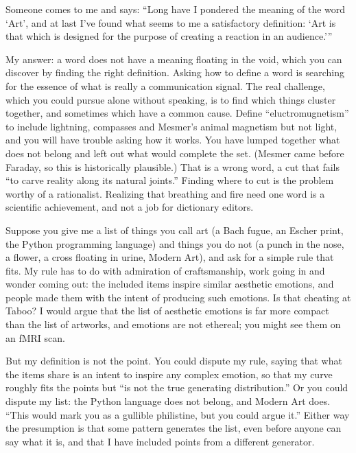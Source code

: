 
Someone comes to me and says: ``Long have I pondered the meaning of the word `Art', and at last I've found what seems to me a satisfactory definition: `Art is that which is designed for the purpose of creating a reaction in an audience.''' 

My answer: a word does not have a meaning floating in the void, which you can discover by finding the right definition. Asking how to define a word is searching for the essence of what is really a communication signal. The real challenge, which you could pursue alone without speaking, is to find which things cluster together, and sometimes which have a common cause. Define ``eluctromugnetism'' to include lightning, compasses and Mesmer's animal magnetism but not light, and you will have trouble asking how it works. You have lumped together what does not belong and left out what would complete the set. (Mesmer came before Faraday, so this is historically plausible.) That is a wrong word, a cut that fails ``to carve reality along its natural joints.'' Finding where to cut is the problem worthy of a rationalist. Realizing that breathing and fire need one word is a scientific achievement, and not a job for dictionary editors.

Suppose you give me a list of things you call art (a Bach fugue, an Escher print, the Python programming language) and things you do not (a punch in the nose, a flower, a cross floating in urine, Modern Art), and ask for a simple rule that fits. My rule has to do with admiration of craftsmanship, work going in and wonder coming out: the included items inspire similar aesthetic emotions, and people made them with the intent of producing such emotions.  Is that cheating at Taboo? I would argue that the list of aesthetic emotions is far more compact than the list of artworks, and emotions are not ethereal; you might see them on an fMRI scan.

But my definition is not the point. You could dispute my rule, saying that what the items share is an intent to inspire any complex emotion, so that my curve roughly fits the points but ``is not the true generating distribution.'' Or you could dispute my list: the Python language does not belong, and Modern Art does. ``This would mark you as a gullible philistine, but you could argue it.'' Either way the presumption is that some pattern generates the list, even before anyone can say what it is, and that I have included points from a different generator. 

